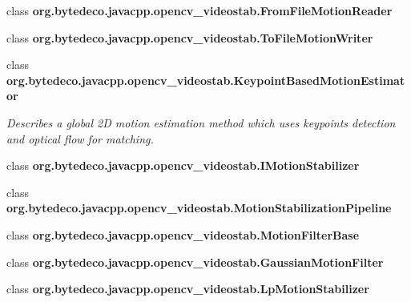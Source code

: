\begin{DoxyCompactItemize}
class {\bfseries org.\+bytedeco.\+javacpp.\+opencv\+\_\+videostab.\+From\+File\+Motion\+Reader}
\item 
class {\bfseries org.\+bytedeco.\+javacpp.\+opencv\+\_\+videostab.\+To\+File\+Motion\+Writer}
\item 
class {\bfseries org.\+bytedeco.\+javacpp.\+opencv\+\_\+videostab.\+Keypoint\+Based\+Motion\+Estimator}
\begin{DoxyCompactList}\small\item\em Describes a global 2D motion estimation method which uses keypoints detection and optical flow for matching. \end{DoxyCompactList}\item 
class {\bfseries org.\+bytedeco.\+javacpp.\+opencv\+\_\+videostab.\+I\+Motion\+Stabilizer}
\item 
class {\bfseries org.\+bytedeco.\+javacpp.\+opencv\+\_\+videostab.\+Motion\+Stabilization\+Pipeline}
\item 
class {\bfseries org.\+bytedeco.\+javacpp.\+opencv\+\_\+videostab.\+Motion\+Filter\+Base}
\item 
class {\bfseries org.\+bytedeco.\+javacpp.\+opencv\+\_\+videostab.\+Gaussian\+Motion\+Filter}
\item 
class {\bfseries org.\+bytedeco.\+javacpp.\+opencv\+\_\+videostab.\+Lp\+Motion\+Stabilizer}
\end{DoxyCompactItemize}
